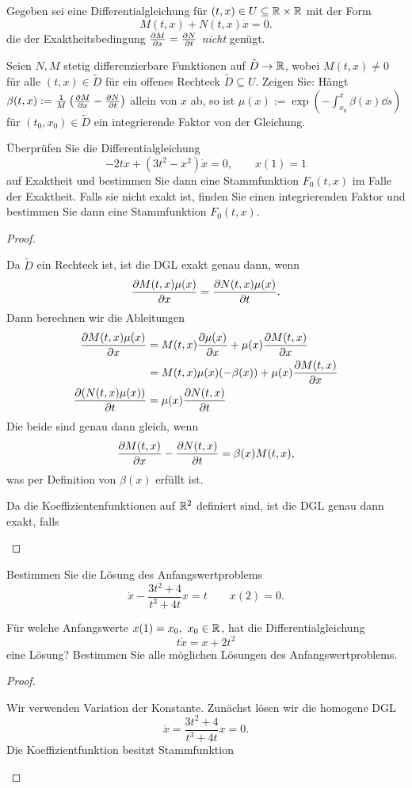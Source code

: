 \begin{Problem}
	Gegeben sei eine Differentialgleichung für $(t,x)\in U\subseteq \mathbb{R} \times \mathbb{R}$ mit der Form
	\[
		M(t, x)+N(t, x)\dot{x}=0
	.\] 
	die der Exaktheitsbedingung $\pdv{M}{x}=\pdv{N}{t}$ \emph{nicht} genügt.
	\begin{parts}
	\item Seien $N,M$ stetig differenzierbare Funktionen auf $\tilde{D}\to \mathbb{R}$, wobei $M(t, x)\neq 0$ f\"{u}r alle $(t,x)\in \tilde{D}$ f\"{u}r ein offenes Rechteck $\tilde{D}\subseteq U$. Zeigen Sie: H\"{a}ngt $\beta(t, x):=\frac{1}{M}\left( \pdv{M}{x}-\pdv{N}{t} \right) $ allein von $x$ ab, so ist $\mu(x):=\exp\left( -\int_{x_0}^x \beta(x)\dd{s} \right) $ f\"{u}r $(t_0, x_0)\in \tilde{D}$ ein integrierende Faktor von der Gleichung.
	\item \"{U}berpr\"{u}fen Sie die Differentialgleichung
		\[
			-2tx+(3t^2-x^2)\dot{x}=0,\qquad x(1)=1
		\]
		auf Exaktheit und bestimmen Sie dann eine Stammfunktion $F_0(t,x)$ im Falle der Exaktheit. Falls sie nicht exakt ist, finden Sie einen integrierenden Faktor und bestimmen Sie dann eine Stammfunktion $F_0(t,x)$.
	\end{parts}
\end{Problem}
\begin{proof}
	\begin{parts}
	\item Da $\tilde{D}$ ein Rechteck ist, ist die DGL exakt genau dann, wenn
	\[
		\pdv{M(t, x)\mu(x)}{x}=\pdv{N(t, x)\mu(x)}{t} 
	.\] 
	Dann berechnen wir die Ableitungen
	\begin{align*}
		\pdv{M(t, x)\mu(x)}{x}&= M(t, x)\pdv{\mu(x)}{x}+\mu(x)\pdv{M(t,x)}{x}\\
				      &=M(t, x)\mu(x)(-\beta(x))+\mu(x)\pdv{M(t,x)}{x}\\
		\pdv{(N(t,x)\mu(x))}{t}&=\mu(x)\pdv{N(t,x)}{t}
	\end{align*}
	Die beide sind genau dann gleich, wenn
	\[
		\pdv{M(t, x)}{x}-\pdv{N(t,x)}{t}=\beta(x)M(t,x)
	,\] 
	was per Definition von $\beta(x)$ erf\"{u}llt ist.
\item Da die Koeffizientenfunktionen auf $\mathbb{R}^2$ definiert sind, ist die DGL genau dann exakt, falls
\end{parts}
\end{proof}
\begin{Problem}
	\begin{parts}
	\item Bestimmen Sie die L\"{o}sung des Anfangswertproblems
		\[
			\dot{x}-\frac{3t^2+4}{t^3+4t}x=t\qquad x(2)=0
		.\] 
	\item F\"{u}r welche Anfangswerte $x(1)=x_0,~x_0\in \mathbb{R}$, hat die Differentialgleichung
		\[
			t\dot{x}=x+2t^2
		\]
		eine L\"{o}sung? Bestimmen Sie alle m\"{o}glichen L\"{o}sungen des Anfangswertproblems.
	\end{parts}
\end{Problem}
\begin{proof}
	\begin{parts}
	\item Wir verwenden Variation der Konstante. Zunächst lösen wir die homogene DGL
		\[
			\dot{x}=\frac{3t^2+4}{t^3+4t}x=0
		.\] 
Die Koeffizientfunktion besitzt Stammfunktion
	\end{parts}
\end{proof}
